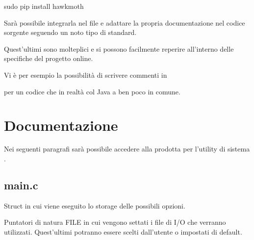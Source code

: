 \documentclass[letterpaper,10pt,italian,openany,oneside]{sphinxmanual}
\begin{document}
\begin{sphinxVerbatim}[commandchars=\\\{\}]
\PYGZdl{} sudo pip install hawkmoth
\end{sphinxVerbatim}

Sarà possibile integrarla nel file  e adattare la propria documentazione nel codice
sorgente seguendo un noto tipo di standard.

Quest’ultimi sono molteplici e si possono facilmente reperire all’interno delle specifiche del progetto
online.

Vi è per esempio la possibilità di scrivere commenti in  %
\begin{footnote}[2]\sphinxAtStartFootnote
{}
%
\end{footnote} per un codice che in
realtà col Java a ben poco in comune.


\chapter{Documentazione}
\label{\detokenize{documentazione:documentazione}}\label{\detokenize{documentazione::doc}}
Nei seguenti paragrafi sarà possibile accedere alla  prodotta per l’utility di
sistema .


\section{main.c}
\label{\detokenize{code/main:main-c}}\label{\detokenize{code/main::doc}}

\begin{fulllineitems}
\label{\detokenize{code/main:c.options}}
Struct in cui viene eseguito lo storage delle possibili opzioni.

\end{fulllineitems}


\begin{fulllineitems}
\label{\detokenize{code/main:c.file_input}}
Puntatori di natura FILE in cui vengono settati i file di I/O che verranno utilizzati.
Quest’ultimi potranno essere scelti dall’utente o impostati di default.

\end{fulllineitems}
\end{document}
